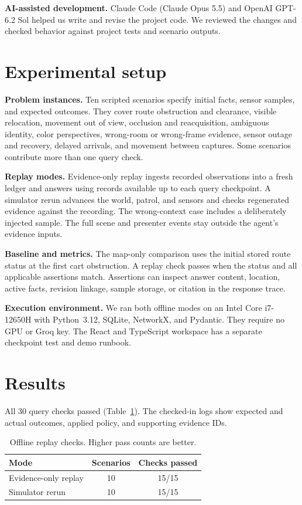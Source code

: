 \documentclass[11pt,a4paper,twocolumn]{article}
\begin{document}
\textbf{AI-assisted development.} Claude Code (Claude Opus 5.5)
and OpenAI GPT-6.2 Sol helped us write and revise the project code.
We reviewed the changes and checked behavior against project tests
and scenario outputs.

\section{Experimental setup}
\textbf{Problem instances.} Ten scripted scenarios specify initial
facts, sensor samples, and expected outcomes. They cover route
obstruction and clearance, visible relocation, movement out of view,
occlusion and reacquisition, ambiguous identity, color perspectives,
wrong-room or wrong-frame evidence, sensor outage and recovery, delayed
arrivals, and movement between captures. Some scenarios contribute
more than one query check.

\textbf{Replay modes.} Evidence-only replay ingests recorded
observations into a fresh ledger and answers using records available
up to each query checkpoint. A simulator rerun advances the world,
patrol, and sensors and checks regenerated evidence against the
recording. The wrong-context case includes a deliberately injected
sample. The full scene and presenter events stay outside the agent's
evidence inputs.

\textbf{Baseline and metrics.} The map-only comparison uses the
initial stored route status at the first cart obstruction. A replay
check passes when the status and all applicable assertions match.
Assertions can inspect answer content, location, active facts,
revision linkage, sample storage, or citation in the response trace.

\textbf{Execution environment.} We ran both offline modes on an Intel
Core i7-12650H with Python~3.12, SQLite, NetworkX, and Pydantic. They
require no GPU or Groq key. The React and TypeScript workspace has a
separate checkpoint test and demo runbook.

\section{Results}
All 30 query checks passed (Table~\ref{tab:results}). The checked-in
logs show expected and actual outcomes, applied policy, and supporting
evidence IDs.

\begin{table}[h]
\centering
\small
\begin{tabular}{lcc}
\toprule
Mode & Scenarios & Checks passed \\
\midrule
Evidence-only replay & 10 & 15/15 \\
Simulator rerun & 10 & 15/15 \\
\bottomrule
\end{tabular}
\caption{Offline replay checks. Higher pass counts are better.}
\label{tab:results}
\end{table}
\end{document}
